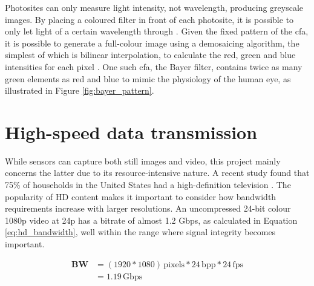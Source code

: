 \documentclass[a4paper]{report}
\begin{document}
Photosites can only measure light intensity, not wavelength, producing greyscale images. By placing a coloured filter in front of each photosite, it is possible to only let light of a certain wavelength through \cite{12_eastman_kodak_company_1976}. Given the fixed pattern of the \gls{cfa}, it is possible to generate a full-colour image using a demosaicing algorithm, the simplest of which is bilinear interpolation, to calculate the red, green and blue intensities for each pixel \cite{13_malvar_he_cutler_2015}. One such \gls{cfa}, the Bayer filter, contains twice as many green elements as red and blue to mimic the physiology of the human eye, as illustrated in Figure \ref{fig:bayer_pattern}.

\section{High-speed data transmission}

While sensors can capture both still images and video, this project mainly concerns the latter due to its resource-intensive nature. A recent study found that 75\% of households in the United States had a high-definition television \cite{14_leichtman_research_group_2013}. The popularity of HD content makes it important to consider how bandwidth requirements increase with larger resolutions. An uncompressed 24-bit colour 1080p video at 24p has a bitrate of almost 1.2 Gbps, as calculated in Equation \ref{eq:hd_bandwidth}, well within the range where signal integrity becomes important.

\begin{equation}
  \begin{split}
    \mathbf{BW} &= (1920*1080) \, \mathrm{pixels} * 24  \, \mathrm{bpp} * 24 \, \mathrm{fps} \\
                &= 1.19  \, \mathrm{Gbps}
  \end{split}  
  \label{eq:hd_bandwidth}
\end{equation}
\end{document}
